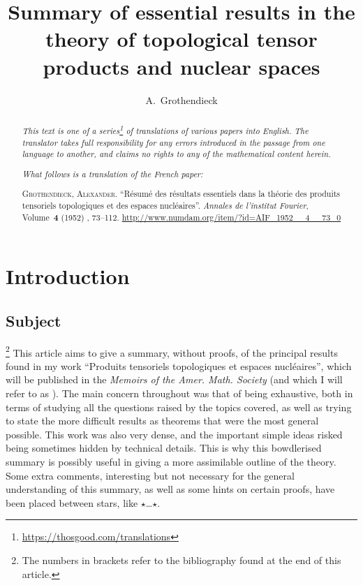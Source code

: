 \documentclass{article}
\title{Summary of essential results in the theory of topological tensor products and nuclear spaces}
\author{A.~Grothendieck}
\date{}
\theoremstyle{plain}
\newcommand{\aster}[1]{$\star${#1}$\star$}
\newcommand{\oldpage}[1]{\marginpar{\footnotesize$\Big\vert$ \textit{p.~#1}}}
\begin{document}
\maketitle
\thispagestyle{fancy}

\renewcommand{\abstractname}{Translator's note.}

\begin{abstract}
  \renewcommand*{\thefootnote}{\fnsymbol{footnote}}
  \emph{This text is one of a series\footnote{\url{https://thosgood.com/translations}} of translations of various papers into English.}
  \emph{The translator takes full responsibility for any errors introduced in the passage from one language to another, and claims no rights to any of the mathematical content herein.}

  \medskip
  
  \emph{What follows is a translation of the French paper:}

  \medskip\noindent
  \textsc{Grothendieck, Alexander}.
  ``R\'{e}sum\'{e} des r\'{e}sultats essentiels dans la th\'{e}orie des produits tensoriels topologiques et des espaces nucl\'{e}aires''.
  \emph{Annales de l'institut Fourier}, Volume~\textbf{4} (1952) , 73--112.
  {\url{http://www.numdam.org/item/?id=AIF_1952__4__73_0}}
\end{abstract}

\setcounter{footnote}{0}

\tableofcontents
\bigskip



\section*{Introduction}
\label{section:introduction}
%


\subsection*{Subject}
\label{subsection:subject}
%

\oldpage{73}

\footnote{The numbers in brackets refer to the bibliography found at the end of this article.}
This article aims to give a summary, without proofs, of the principal results found in my work ``Produits tensoriels topologiques et espaces nucl\'{e}aires'', which will be published in the \emph{Memoirs of the Amer. Math. Society} (and which I will refer to as \cite{PTT}).
The main concern throughout \cite{PTT} was that of being exhaustive, both in terms of studying all the questions raised by the topics covered, as well as trying to state the more difficult results as theorems that were the most general possible.
This work was also very dense, and the important simple ideas risked being sometimes hidden by technical details.
This is why this bowdlerised summary is possibly useful in giving a more assimilable outline of the theory.
Some extra comments, interesting but not necessary for the general understanding of this summary, as well as some hints on certain proofs, have been placed between stars, like \aster{\ldots}.
\end{document}
